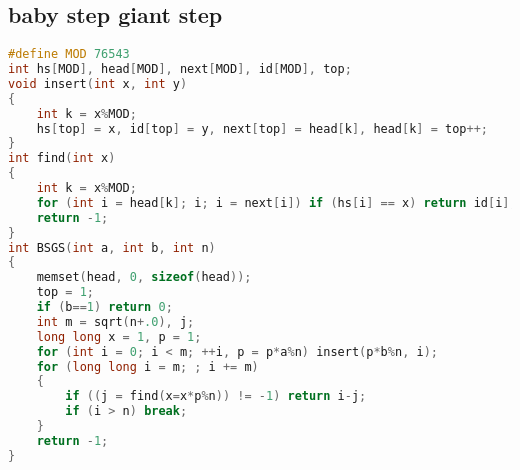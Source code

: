 \subsection{baby step giant step}
    \begin{lstlisting}[language=c++]
#define MOD 76543
int hs[MOD], head[MOD], next[MOD], id[MOD], top;
void insert(int x, int y)
{
    int k = x%MOD;
    hs[top] = x, id[top] = y, next[top] = head[k], head[k] = top++;
}
int find(int x)
{
    int k = x%MOD;
    for (int i = head[k]; i; i = next[i]) if (hs[i] == x) return id[i];
    return -1;
}
int BSGS(int a, int b, int n)
{
    memset(head, 0, sizeof(head));
    top = 1;
    if (b==1) return 0;
    int m = sqrt(n+.0), j;
    long long x = 1, p = 1;
    for (int i = 0; i < m; ++i, p = p*a%n) insert(p*b%n, i);
    for (long long i = m; ; i += m)
    {
        if ((j = find(x=x*p%n)) != -1) return i-j;
        if (i > n) break;
    }
    return -1;
}
    \end{lstlisting}
